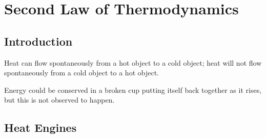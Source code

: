 \chapter{Second Law of Thermodynamics}

\section{Introduction}

\begin{definition}
    Heat can flow spontaneously from a hot object to a cold object; heat will not flow spontaneously from a cold object to a hot object.
\end{definition}
\begin{remark}Energy could be conserved in a broken cup putting itself back together as it rises, but this is not observed to happen.
\end{remark}

\section{Heat Engines}

